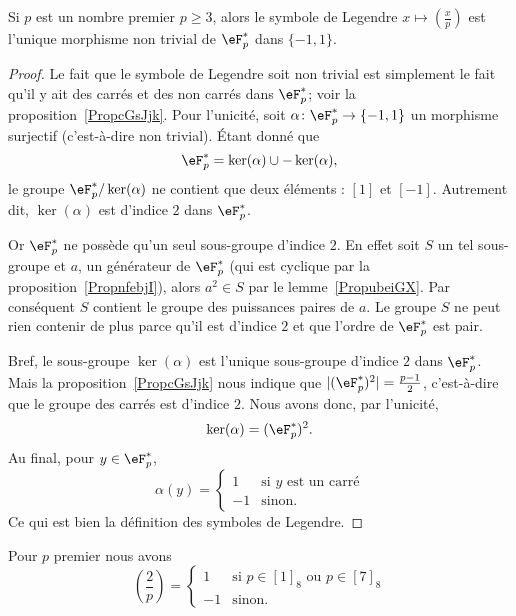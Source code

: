 \begin{lemma}\label{Lemoabzrn}
	Si \( p\) est un nombre premier \( p\geq 3\), alors le symbole de Legendre \( x\mapsto\left(\frac{x}{p}\right)\) est l'unique morphisme non trivial de \( \eF^*_p\) dans \( \{ -1,1 \}\).
\end{lemma}

\begin{proof}
	Le fait que le symbole de Legendre soit non trivial est simplement le fait qu'il y ait des carrés et des non carrés dans \( \eF_p^*\); voir la proposition~\ref{PropcGsJjk}. Pour l'unicité, soit \( \alpha\colon \eF^*_p\to \{ -1,1 \}\) un morphisme surjectif (c'est-à-dire non trivial). Étant donné que
	\begin{equation}
		\eF^*_p=\ker(\alpha)\cup-\ker(\alpha),
	\end{equation}
	le groupe \( \eF_p^*/\ker(\alpha)\) ne contient que deux éléments : \( [1]\) et \( [-1]\). Autrement dit, \( \ker(\alpha)\) est d'indice \( 2\) dans \( \eF_p^*\).

	Or \( \eF_p^*\) ne possède qu'un seul sous-groupe d'indice \( 2\). En effet soit \( S\) un tel sous-groupe et \( a\), un générateur de \( \eF_p^*\) (qui est cyclique par la proposition~\ref{PropnfebjI}), alors \( a^2\in S\) par le lemme~\ref{PropubeiGX}. Par conséquent \( S\) contient le groupe des puissances paires de \( a\). Le groupe \( S\) ne peut rien contenir de plus parce qu'il est d'indice \( 2\) et que l'ordre de \( \eF_p^*\) est pair.

	Bref, le sous-groupe \( \ker(\alpha)\) est l'unique sous-groupe d'indice \( 2\) dans \( \eF_p^*\). Mais la proposition~\ref{PropcGsJjk} nous indique que \( | (\eF_p^*)^2 |=\frac{ p-1 }{2}\), c'est-à-dire que le groupe des carrés est d'indice \( 2\). Nous avons donc, par l'unicité,
	\begin{equation}
		\ker(\alpha)=(\eF_p^*)^2.
	\end{equation}
	Au final, pour \( y\in \eF_p^*\),
	\begin{equation}
		\alpha(y)=\begin{cases}
			1  & \text{si } y\text{ est un carré} \\
			-1 & \text{sinon.}
		\end{cases}
	\end{equation}
	Ce qui est bien la définition des symboles de Legendre.
\end{proof}

\begin{proposition}
	Pour \( p\) premier nous avons
	\begin{equation}
		\left(\frac{2}{p}\right)=\begin{cases}
			1  & \text{si } p\in [1]_8\text{ ou } p\in [7]_8 \\
			-1 & \text{sinon}.
		\end{cases}
	\end{equation}
\end{proposition}

